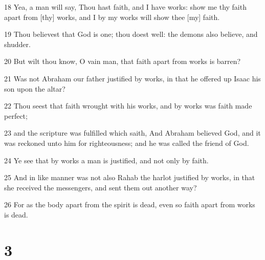 \par 18 Yea, a man will say, Thou hast faith, and I have works: show me thy faith apart from [thy] works, and I by my works will show thee [my] faith.
\par 19 Thou believest that God is one; thou doest well: the demons also believe, and shudder.
\par 20 But wilt thou know, O vain man, that faith apart from works is barren?
\par 21 Was not Abraham our father justified by works, in that he offered up Isaac his son upon the altar?
\par 22 Thou seest that faith wrought with his works, and by works was faith made perfect;
\par 23 and the scripture was fulfilled which saith, And Abraham believed God, and it was reckoned unto him for righteousness; and he was called the friend of God.
\par 24 Ye see that by works a man is justified, and not only by faith.
\par 25 And in like manner was not also Rahab the harlot justified by works, in that she received the messengers, and sent them out another way?
\par 26 For as the body apart from the spirit is dead, even so faith apart from works is dead.

\chapter{3}

